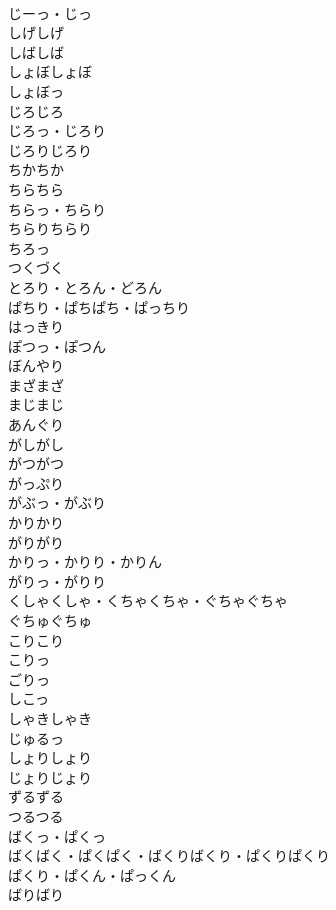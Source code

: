 \documentclass[8pt]{extreport}
\begin{document}
\begin{CJK}{UTF8}{min}
\\	じーっ・じっ	
\\	しげしげ	
\\	しばしば	
\\	しょぼしょぼ	
\\	しょぼっ	
\\	じろじろ	
\\	じろっ・じろり	
\\	じろりじろり	
\\	ちかちか	
\\	ちらちら	
\\	ちらっ・ちらり	
\\	ちらりちらり	
\\	ちろっ	
\\	つくづく	
\\	とろり・とろん・どろん	
\\	ぱちり・ぱちぱち・ぱっちり	
\\	はっきり	
\\	ぽつっ・ぽつん	
\\	ぼんやり	
\\	まざまざ	
\\	まじまじ	
\\	あんぐり	
\\	がしがし	
\\	がつがつ	
\\	がっぷり	
\\	がぶっ・がぶり	
\\	かりかり	
\\	がりがり	
\\	かりっ・かりり・かりん	
\\	がりっ・がりり	
\\	くしゃくしゃ・くちゃくちゃ・ぐちゃぐちゃ	
\\	ぐちゅぐちゅ	
\\	こりこり	
\\	こりっ	
\\	ごりっ	
\\	しこっ	
\\	しゃきしゃき	
\\	じゅるっ	
\\	しょりしょり	
\\	じょりじょり	
\\	ずるずる	
\\	つるつる	
\\	ばくっ・ぱくっ	
\\	ばくばく・ぱくぱく・ばくりばくり・ぱくりぱくり	
\\	ぱくり・ぱくん・ぱっくん	
\\	ばりばり	

\end{CJK}
\end{document}
